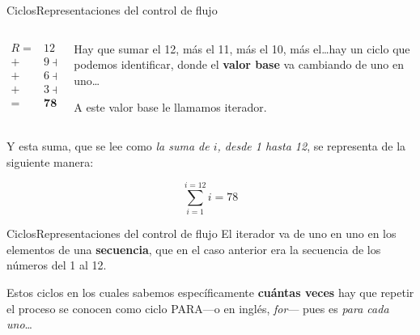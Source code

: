 \documentclass[spanish, c, handout]{beamer}
\begin{document}
\begin{frame}{Ciclos}{Representaciones del control de flujo}

    \begin{columns}
        \begin{column}{0.5\linewidth}
            \begin{align*}
                R = & 12  + 11 + 10 \\
                  + &  9 + 8 + 7 \\
                  + &  6 + 5 + 4 \\
                  + &  3 + 2 + 1 \\
                  = & \mathbf{78}
            \end{align*} \pause
        \end{column}

        \begin{column}{0.5\linewidth}
            Hay que sumar el 12, más el 11, más el 10, más el\dots hay un ciclo que podemos identificar, donde el \textbf{valor base} va cambiando de uno en uno\dots

            A este valor base le llamamos \alert{iterador}. \pause
        \end{column}
    \end{columns}

    Y esta suma, que se lee como \textit{la suma de $i$, desde 1 hasta 12}, se representa de la siguiente manera:
    
    $$\sum\limits_{i=1}^{i=12} i = 78$$
\end{frame}

\begin{frame}{Ciclos}{Representaciones del control de flujo}
    El \alert{iterador} va de uno en uno en los elementos de una \textbf{secuencia}, que en el caso anterior era la secuencia de los números del 1 al 12.

    \bigskip

    Estos ciclos en los cuales sabemos específicamente \textbf{cuántas veces} hay que repetir el proceso se conocen como \alert{ciclo PARA}---o en inglés, \textit{for}--- pues es \textit{para cada uno}\dots

    \bigskip

    \begin{columns}
        \begin{column}{0.95\linewidth}
            
        \end{column}
    \end{columns}
\end{frame}
\end{document}
